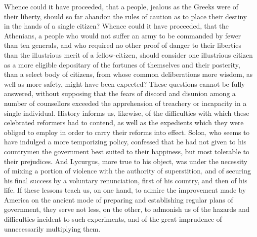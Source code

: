 Whence could it have proceeded, that a people, jealous as the Greeks were of their liberty, should so far abandon the rules of caution as to place their destiny in the hands of a single citizen? Whence could it have proceeded, that the Athenians, a people who would not suffer an army to be commanded by fewer than ten generals, and who required no other proof of danger to their liberties than the illustrious merit of a fellow-citizen, should consider one illustrious citizen as a more eligible depositary of the fortunes of themselves and their posterity, than a select body of citizens, from whose common deliberations more wisdom, as well as more safety, might have been expected? These questions cannot be fully answered, without supposing that the fears of discord and disunion among a number of counsellors exceeded the apprehension of treachery or incapacity in a single individual. History informs us, likewise, of the difficulties with which these celebrated reformers had to contend, as well as the expedients which they were obliged to employ in order to carry their reforms into effect. Solon, who seems to have indulged a more temporizing policy, confessed that he had not given to his countrymen the government best suited to their happiness, but most tolerable to their prejudices. And Lycurgus, more true to his object, was under the necessity of mixing a portion of violence with the authority of superstition, and of securing his final success by a voluntary renunciation, first of his country, and then of his life. If these lessons teach us, on one hand, to admire the improvement made by America on the ancient mode of preparing and establishing regular plans of government, they serve not less, on the other, to admonish us of the hazards and difficulties incident to such experiments, and of the great imprudence of unnecessarily multiplying them.

